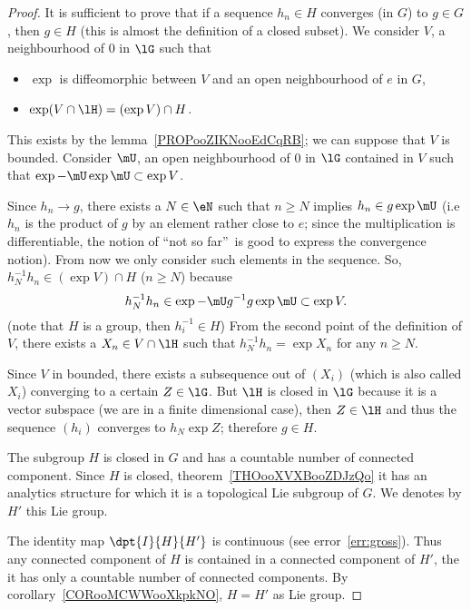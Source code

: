 \begin{proof}
	 It is sufficient to prove that if a sequence $h_n\in H$ converges (in $G$) to $g\in G$, then $g\in H$ (this is almost the definition of a closed subset). We consider $V$, a neighbourhood of $0$ in $\lG$ such that

	\begin{itemize}
		\item $\exp$ is diffeomorphic between $V$ and an open neighbourhood  of $e$ in $G$,
		\item $\exp(V\cap \lH)=(\exp V)\cap H$.
	\end{itemize}
	This exists by the lemma~\ref{PROPooZIKNooEdCqRB}; we can suppose that $V$ is bounded. Consider $\mU$, an open neighbourhood of $0$ in $\lG$ contained in $V$ such that $\exp-\mU\exp\mU\subset\exp V$.

	Since $h_n\to g$, there exists a $N\in\eN$ such that $n\geq N$ implies $h_n\in g\exp\mU$ (i.e $h_n$ is the product of $g$ by an element rather close to $e$; since the multiplication is differentiable, the notion of ``not so far''\ is good to express the convergence notion). From now we only consider such elements in the sequence. So, $h_N^{-1} h_n\in(\exp V)\cap H$ ($n\geq N$) because
	\[
		h_N^{-1} h_n\in\exp-\mU g^{-1} g\exp\mU\subset\exp V.
	\]
	(note that $H$ is a group, then $h_i^{-1}\in H$) From the second point of the definition of $V$, there exists a $X_n\in V\cap\lH$ such that $h^{-1}_N h_n=\exp X_n$ for any $n\geq N$.

	Since $V$ in bounded, there exists a subsequence out of $(X_i)$ (which is also called $X_i$) converging to a certain $Z\in\lG$. But $\lH$ is closed in $\lG$ because it is a vector subspace (we are in a finite dimensional case), then $Z\in\lH$ and thus the sequence $(h_i)$ converges to $h_N\exp Z$; therefore $g\in H$.

	 The subgroup $H$ is closed in $G$ and has a countable number of connected component. Since $H$ is closed, theorem~\ref{THOooXVXBooZDJzQo} it has an analytics structure for which it is a topological Lie subgroup of $G$. We denotes by $H'$ this Lie group.

	The identity map $\dpt{I}{H}{H'}$ is continuous (see error~\ref{err:gross}). Thus any connected component of $H$ is contained in a connected component of $H'$, the it has only a countable number of connected components. By corollary~\ref{CORooMCWWooXkpkNO}, $H=H'$ as Lie group.
\end{proof}

